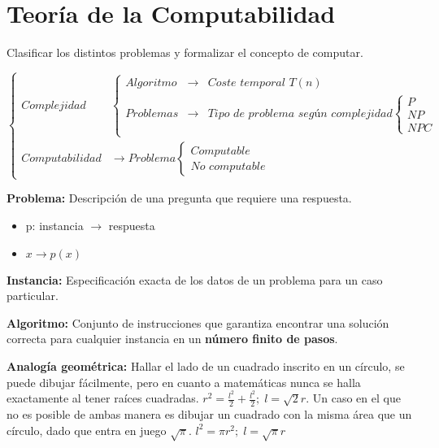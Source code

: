 \chapter{Teoría de la Computabilidad}\label{ch:teoria-de-la-computabilidad}
Clasificar los distintos problemas y formalizar el concepto de computar.

$\left\{\begin{matrix}
		Complejidad    & \left\{\begin{matrix}
			Algoritmo & \rightarrow & \textit{Coste temporal } T(n)                                                       \\
			Problemas & \rightarrow & \textit{Tipo de problema según complejidad} \left\{\begin{matrix}
				P   \\
				NP  \\
				NPC
			\end{matrix}\right.
		\end{matrix}\right.                     \\
		Computabilidad & \rightarrow Problema \left\{\begin{matrix}
			Computable             \\
			\textit{No computable}
		\end{matrix}\right.
	\end{matrix}\right.$

\textbf{Problema:} Descripción de una pregunta que requiere una respuesta.
\begin{itemize}
	\item p: instancia $\rightarrow$ respuesta
	\item $x \rightarrow p(x)$
\end{itemize}

\textbf{Instancia:} Especificación exacta de los datos de un problema para un caso particular.

\textbf{Algoritmo:} Conjunto de instrucciones que garantiza encontrar una solución correcta para cualquier instancia en un \textbf{número finito de pasos}.

\textbf{Analogía geométrica:} Hallar el lado de un cuadrado inscrito en un círculo, se puede dibujar fácilmente, pero en cuanto a matemáticas nunca se halla exactamente al tener raíces cuadradas. $r^2 = \frac{l^2}{2}+\frac{l^2}{2}; \; l= \sqrt{2}r$. Un caso en el que no es posible de ambas manera es dibujar un cuadrado con la misma área que un círculo, dado que entra en juego $\sqrt{\pi}$. $l^2 = \pi r^2; \; l = \sqrt{\pi}r$

